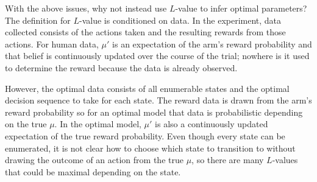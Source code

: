 With the above issues, why not instead use $L$-value to infer optimal parameters? The definition for $L$-value is conditioned on data. In the experiment, data collected consists of the actions taken and the resulting rewards from those actions. For human data, $\mu'$ is an expectation of the arm's reward probability and that belief is continuously updated over the course of the trial; nowhere is it used to determine the reward because the data is already observed. 

However, the optimal data consists of all enumerable states and the optimal decision sequence to take for each state. The reward data is drawn from the arm's reward probability so for an optimal model that data is probabilistic depending on the true $\mu$. In the optimal model, $\mu'$ is also a continuously updated expectation of the true reward probability. Even though every state can be enumerated, it is not clear how to choose which state to transition to without drawing the outcome of an action from the true $\mu$, so there are many $L$-values that could be maximal depending on the state.